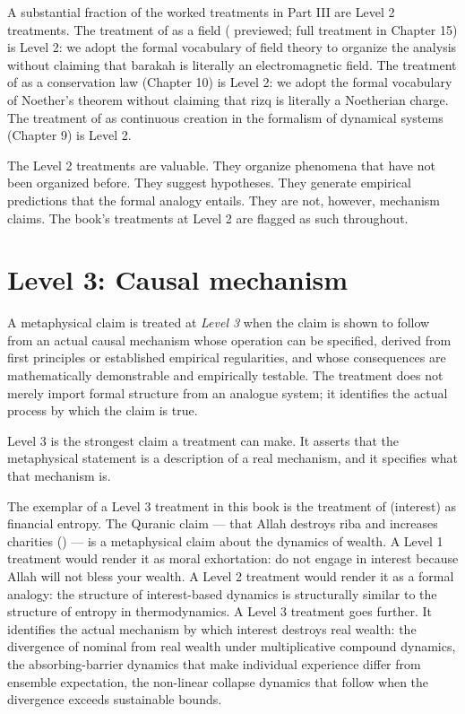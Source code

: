 A substantial fraction of the worked treatments in Part III are
Level 2 treatments. The treatment of  as a field
( previewed; full treatment in Chapter 15) is
Level 2: we adopt the formal vocabulary of field theory to organize
the analysis without claiming that barakah is literally an
electromagnetic field. The treatment of  as a
conservation law (Chapter 10) is Level 2: we adopt the formal
vocabulary of Noether's theorem without claiming that rizq is
literally a Noetherian charge. The treatment of  as
continuous creation in the formalism of dynamical systems (Chapter 9)
is Level 2.

The Level 2 treatments are valuable. They organize phenomena that
have not been organized before. They suggest hypotheses. They
generate empirical predictions that the formal analogy entails. They
are not, however, mechanism claims. The book's treatments at Level 2
are flagged as such throughout.

\section{Level 3: Causal mechanism}
\label{sec:level-3}

\begin{definition}
\label{def:causal-mechanism}
A metaphysical claim is treated at \emph{Level 3} when the claim is
shown to follow from an actual causal mechanism whose operation can
be specified, derived from first principles or established empirical
regularities, and whose consequences are mathematically demonstrable
and empirically testable. The treatment does not merely import
formal structure from an analogue system; it identifies the actual
process by which the claim is true.
\end{definition}

Level 3 is the strongest claim a treatment can make. It asserts that
the metaphysical statement is a description of a real mechanism, and
it specifies what that mechanism is.

The exemplar of a Level 3 treatment in this book is the treatment of
 (interest) as financial entropy. The Quranic claim ---
that Allah destroys riba and increases charities () ---
is a metaphysical claim about the dynamics of wealth. A Level 1
treatment would render it as moral exhortation: do not engage in
interest because Allah will not bless your wealth. A Level 2
treatment would render it as a formal analogy: the structure of
interest-based dynamics is structurally similar to the structure of
entropy in thermodynamics. A Level 3 treatment goes further. It
identifies the actual mechanism by which interest destroys real
wealth: the divergence of nominal from real wealth under
multiplicative compound dynamics, the absorbing-barrier dynamics that
make individual experience differ from ensemble expectation, the
non-linear collapse dynamics that follow when the divergence exceeds
sustainable bounds.

